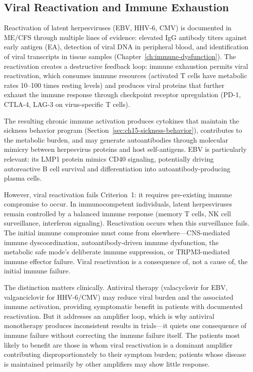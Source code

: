 \subsection{Viral Reactivation and Immune Exhaustion}
\label{sec:amp-viral}

Reactivation of latent herpesviruses (EBV, HHV-6, CMV) is documented in ME/CFS through multiple lines of evidence: elevated IgG antibody titers against early antigen (EA), detection of viral DNA in peripheral blood, and identification of viral transcripts in tissue samples (Chapter~\ref{ch:immune-dysfunction}). The reactivation creates a destructive feedback loop: immune exhaustion permits viral reactivation, which consumes immune resources (activated T cells have metabolic rates 10--100 times resting levels) and produces viral proteins that further exhaust the immune response through checkpoint receptor upregulation (PD-1, CTLA-4, LAG-3 on virus-specific T cells).

The resulting chronic immune activation produces cytokines that maintain the sickness behavior program (Section~\ref{sec:ch15-sickness-behavior}), contributes to the metabolic burden, and may generate autoantibodies through molecular mimicry between herpesvirus proteins and host self-antigens. EBV is particularly relevant: its LMP1 protein mimics CD40 signaling, potentially driving autoreactive B cell survival and differentiation into autoantibody-producing plasma cells.

However, viral reactivation fails Criterion~1: it requires pre-existing immune compromise to occur. In immunocompetent individuals, latent herpesviruses remain controlled by a balanced immune response (memory T cells, NK cell surveillance, interferon signaling). Reactivation occurs when this surveillance fails. The initial immune compromise must come from elsewhere---CNS-mediated immune dyscoordination, autoantibody-driven immune dysfunction, the metabolic safe mode's deliberate immune suppression, or TRPM3-mediated immune effector failure. Viral reactivation is a consequence of, not a cause of, the initial immune failure.

The distinction matters clinically. Antiviral therapy (valacyclovir for EBV, valganciclovir for HHV-6/CMV) may reduce viral burden and the associated immune activation, providing symptomatic benefit in patients with documented reactivation. But it addresses an amplifier loop, which is why antiviral monotherapy produces inconsistent results in trials---it quiets one consequence of immune failure without correcting the immune failure itself. The patients most likely to benefit are those in whom viral reactivation is a dominant amplifier contributing disproportionately to their symptom burden; patients whose disease is maintained primarily by other amplifiers may show little response.


